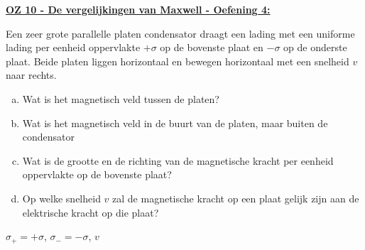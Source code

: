 \textbf{\underline{OZ 10 - De vergelijkingen van Maxwell - Oefening 4:}}
\vspace{0.5cm}

Een zeer grote parallelle platen condensator draagt een lading met een uniforme lading per eenheid oppervlakte $+\sigma$ op de bovenste plaat en $-\sigma$ op de onderste plaat. Beide platen liggen horizontaal en bewegen horizontaal met een snelheid $v$ naar rechts.

\begin{enumerate}[(a)]
    \item Wat is het magnetisch veld tussen de platen?
    \item Wat is het magnetisch veld in de buurt van de platen, maar buiten de condensator
    \item Wat is de grootte en de richting van de magnetische kracht per eenheid oppervlakte op de bovenste plaat?
    \item Op welke snelheid $v$ zal de magnetische kracht op een plaat gelijk zijn aan de elektrische kracht op die plaat?
\end{enumerate}

\begin{description}[labelwidth=1.5cm, leftmargin=!]
    \item[Geg. :]  $\sigma_+ = +\sigma$, $\sigma_- = -\sigma$, $v$
\end{description}

